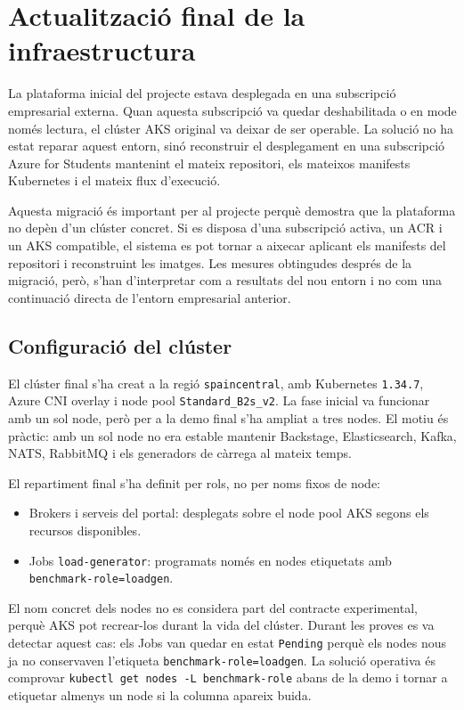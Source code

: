 \section{Actualització final de la infraestructura}

La plataforma inicial del projecte estava desplegada en una subscripció
empresarial externa. Quan aquesta subscripció va quedar deshabilitada o en mode
només lectura, el clúster AKS original va deixar de ser operable. La solució no
ha estat reparar aquest entorn, sinó reconstruir el desplegament en una
subscripció Azure for Students mantenint el mateix repositori, els mateixos
manifests Kubernetes i el mateix flux d'execució.

Aquesta migració és important per al projecte perquè demostra que la plataforma
no depèn d'un clúster concret. Si es disposa d'una subscripció activa, un ACR i
un AKS compatible, el sistema es pot tornar a aixecar aplicant els manifests del
repositori i reconstruint les imatges. Les mesures obtingudes després de la
migració, però, s'han d'interpretar com a resultats del nou entorn i no com una
continuació directa de l'entorn empresarial anterior.

\subsection{Configuració del clúster}

El clúster final s'ha creat a la regió \texttt{spaincentral}, amb Kubernetes
\texttt{1.34.7}, Azure CNI overlay i node pool \texttt{Standard\_B2s\_v2}. La
fase inicial va funcionar amb un sol node, però per a la demo final s'ha ampliat
a tres nodes. El motiu és pràctic: amb un sol node no era estable mantenir
Backstage, Elasticsearch, Kafka, NATS, RabbitMQ i els generadors de càrrega al
mateix temps.

El repartiment final s'ha definit per rols, no per noms fixos de node:

\begin{itemize}
  \item Brokers i serveis del portal: desplegats sobre el node pool AKS segons
        els recursos disponibles.
  \item Jobs \texttt{load-generator}: programats només en nodes etiquetats amb
        \texttt{benchmark-role=loadgen}.
\end{itemize}

El nom concret dels nodes no es considera part del contracte experimental,
perquè AKS pot recrear-los durant la vida del clúster. Durant les proves es va
detectar aquest cas: els Jobs van quedar en estat \texttt{Pending} perquè els
nodes nous ja no conservaven l'etiqueta \texttt{benchmark-role=loadgen}. La
solució operativa és comprovar \texttt{kubectl get nodes -L benchmark-role}
abans de la demo i tornar a etiquetar almenys un node si la columna apareix
buida.

